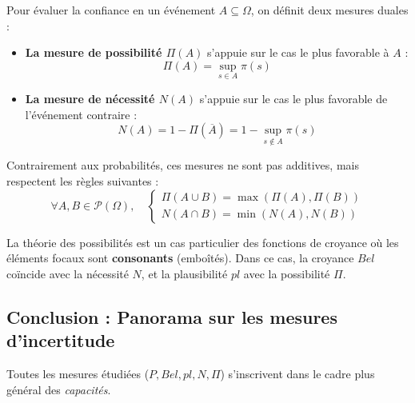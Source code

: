Pour évaluer la confiance en un événement $A \subseteq \Omega$, on définit deux mesures duales :

\begin{definition}
    \begin{itemize}
        \item \textbf{La mesure de possibilité $\Pi(A)$} s'appuie sur le cas le plus favorable à $A$ :
            \begin{equation}
                \boxed{\Pi(A) = \sup_{s \in A} \pi(s)}
            \end{equation}
        \item \textbf{La mesure de nécessité $N(A)$} s'appuie sur le cas le plus favorable de l'événement contraire :
            \begin{equation}
                \boxed{N(A) = 1 - \Pi(\overline{A}) = 1 - \sup_{s \notin A} \pi(s)}
            \end{equation}
    \end{itemize}
\end{definition}

\begin{prop}
    Contrairement aux probabilités, ces mesures ne sont pas additives, mais respectent les règles suivantes :
    \begin{equation}
        \forall A, B \in \mathcal{P}( \Omega), \quad 
        \begin{cases}
            \Pi(A \cup B) = \max(\Pi(A), \Pi(B)) \\ 
            N(A \cap B) = \min(N(A), N(B))
        \end{cases}
    \end{equation}
\end{prop}

\begin{remark}
    La théorie des possibilités est un cas particulier des fonctions de croyance où les éléments focaux sont 
    \textbf{consonants} (emboîtés). Dans ce cas, la croyance $Bel$ coïncide avec la nécessité $N$, 
    et la plausibilité $pl$ avec la possibilité $\Pi$.
\end{remark}

\subsection{Conclusion : Panorama sur les mesures d'incertitude}

Toutes les mesures étudiées ($P, Bel, pl, N, \Pi$) s'inscrivent dans le cadre plus général 
des \emph{capacités}. 

